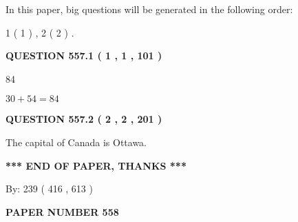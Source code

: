 \documentclass[12pt]{article}
\begin{document}
   
   
\vspace{0.2in}
   
In this paper, big questions will be generated in the following order: 
   
   
   1 ( 1 )
 ,
   2 ( 2 )
 .
  
\vspace{0.2in}
  
{\textbf{\Large{QUESTION
557.1 
 ( 1 , 1 , 101 )
}}}
  
  
 
 
\noindent{}

84
 
 
 
 
\noindent{}

$ %
30 +  %
54=   %
84$
 
 
  
\vspace{0.2in}
  
{\textbf{\Large{QUESTION
557.2 
 ( 2 , 2 , 201 )
}}}
  
  
 
 
\noindent{}
 
 
The capital of Canada is Ottawa.
 
 
 
 
   
   
 \vspace{0.2in}
 
   
   
   
   
\vspace{1.0in} 
{\textbf{\large{ *** END OF PAPER, THANKS *** }}} 
   
   
\hspace{1.0in} By: 
 239 ( 416 ,  613 )
   
   
   
   
\newpage 
\setcounter{page}{ 
   558001 } 
   
   
   
   
 {\textbf{ \Large{ PAPER NUMBER  558  }}}
   
   
\vspace{0.2in}
   
   
   
\end{document}
